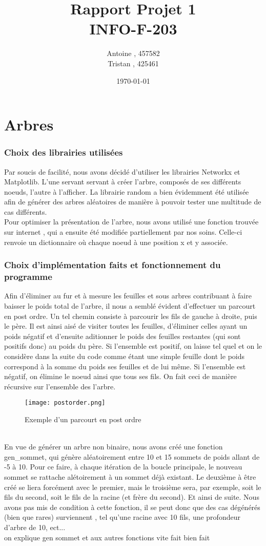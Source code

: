\documentclass[a4paper]{report}
\title{Rapport Projet 1 \\ INFO-F-203}
\author{Antoine \bsc{Lemahieu}, 457582 \\
Tristan \bsc{Philips}, 425461}
\date{\today}
\begin{document}
\maketitle
\renewcommand{\contentsname}{Sommaire}
\tableofcontents
\part{Arbres}
\section{Choix des librairies utilisées}
Par soucis de facilité, nous avons décidé d'utiliser les librairies Networkx et Matplotlib. L'une servant servant à créer l'arbre, composés de ses différents noeuds, l'autre à l'afficher. La librairie random a bien évidemment été utilisée afin de générer des arbres aléatoires de manière à pouvoir tester une multitude de cas différents.
\\Pour optimiser la présentation de l'arbre, nous avons utilisé une fonction trouvée sur internet \cite{hierarchypos}, qui a ensuite été modifiée partiellement par nos soins. Celle-ci renvoie un dictionnaire où chaque noeud à une position x et y associée.
\section{Choix d'implémentation faits et fonctionnement du programme}
Afin d'éliminer au fur et à mesure les feuilles et sous arbres contribuant à faire baisser le poids total de l'arbre, il nous a semblé évident d'effectuer un parcourt en post ordre. Un tel chemin consiste à parcourir les fils de gauche à droite, puis le père. Il est ainsi aisé de visiter toutes les feuilles, d'éliminer celles ayant un poids négatif et d'ensuite aditionner le poids des feuilles restantes (qui sont positifs donc) au poids du père. Si l'ensemble est positif, on laisse tel quel et on le considère dans la suite du code comme étant une simple feuille dont le poids correspond à la somme du poids ses feuilles et de lui même. Si l'ensemble est négatif, on élimine le noeud ainsi que tous ses fils. On fait ceci de manière récursive sur l'ensemble des l'arbre.
\begin{figure}[!h]
\begin{center}
\texttt{[image: postorder.png]}
\caption{Exemple d'un parcourt en post ordre \cite{postorder}}
\end{center}
\end{figure}
\\En vue de générer un arbre non binaire, nous avons créé une fonction gen\_sommet, qui génère aléatoirement entre 10 et 15 sommets de poids allant de -5 à 10. Pour ce faire, à chaque itération de la boucle principale, le nouveau sommet se rattache alétoirement à un sommet déjà existant. Le deuxième à être créé se liera forcément avec le premier, mais le troisième sera, par exemple, soit le fils du second, soit le fils de la racine (et frère du second). Et ainsi de suite. Nous avons pas mis de condition à cette fonction, il se peut donc que des cas dégénérés (bien que rares) surviennent , tel qu'une racine avec 10 fils, une profondeur d'arbre de 10, ect...
\\on explique gen sommet et aux autres fonctions vite fait bien fait
\end{document}
